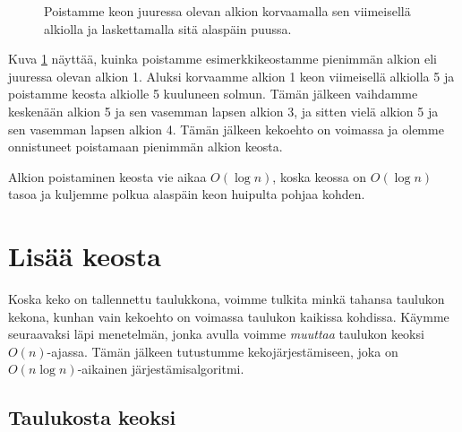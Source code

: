 \begin{figure}
\caption{Poistamme keon juuressa olevan alkion korvaamalla sen viimeisellä alkiolla
ja laskettamalla sitä alaspäin puussa.}
\label{fig:kekpoi}
\end{figure}

Kuva \ref{fig:kekpoi} näyttää, kuinka poistamme
esimerkkikeostamme pienimmän alkion eli juuressa
olevan alkion 1.
Aluksi korvaamme alkion 1
keon viimeisellä alkiolla 5 ja poistamme keosta
alkiolle 5 kuuluneen solmun.
Tämän jälkeen vaihdamme keskenään alkion 5
ja sen vasemman lapsen alkion 3,
ja sitten vielä alkion 5 ja sen vasemman lapsen alkion 4.
Tämän jälkeen kekoehto on voimassa ja olemme onnistuneet
poistamaan pienimmän alkion keosta.

Alkion poistaminen keosta vie aikaa $O(\log n)$,
koska keossa on $O(\log n)$ tasoa ja kuljemme polkua
alaspäin keon huipulta pohjaa kohden.

\section{Lisää keosta}

Koska keko on tallennettu taulukkona,
voimme tulkita minkä tahansa taulukon kekona,
kunhan vain kekoehto on voimassa taulukon kaikissa kohdissa.
Käymme seuraavaksi läpi menetelmän, jonka avulla voimme
\emph{muuttaa} taulukon keoksi $O(n)$-ajassa.
Tämän jälkeen tutustumme kekojärjestämiseen,
joka on $O(n \log n)$-aikainen järjestämisalgoritmi.

\subsection{Taulukosta keoksi}

